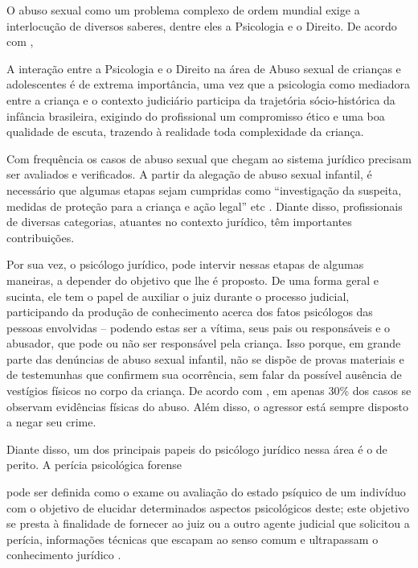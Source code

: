 O abuso sexual como um problema complexo de ordem mundial exige a interlocução de diversos saberes, dentre eles a Psicologia e o Direito. De acordo com , 

\begin{citacao}
	A interação entre a Psicologia e o Direito na área de Abuso sexual de crianças e adolescentes é de extrema importância, uma vez que a psicologia como mediadora entre a criança e o contexto judiciário participa da trajetória sócio-histórica da infância brasileira, exigindo do profissional um compromisso ético e uma boa qualidade de escuta, trazendo à realidade toda complexidade da criança.
\end{citacao}

Com frequência os casos de abuso sexual que chegam ao sistema jurídico precisam ser avaliados e verificados. A partir da alegação de abuso sexual infantil, é necessário que algumas etapas sejam cumpridas como ``investigação da suspeita, medidas de proteção para a criança e ação legal'' etc . Diante disso, profissionais de diversas categorias, atuantes no contexto jurídico, têm importantes contribuições. 

Por sua vez, o psicólogo jurídico, pode intervir nessas etapas de algumas maneiras, a depender do objetivo que lhe é proposto. De uma forma geral e sucinta, ele tem o papel de auxiliar o juiz durante o processo judicial, participando da produção de conhecimento acerca dos fatos psicólogos das pessoas envolvidas -- podendo estas ser a vítima, seus pais ou responsáveis e o abusador, que pode ou não ser responsável pela criança. Isso porque, em grande parte das denúncias de abuso sexual infantil, não se dispõe de provas materiais e de testemunhas que confirmem  sua ocorrência, sem falar da possível ausência de vestígios físicos no corpo da criança. De acordo com , em apenas 30\% dos casos se observam evidências físicas do abuso. Além disso, o agressor está sempre disposto a negar seu crime. 

Diante disso, um dos principais papeis do psicólogo jurídico nessa área é o de perito. A perícia psicológica forense

\begin{citacao}
	pode ser definida como o exame ou avaliação do estado psíquico de um indivíduo com o objetivo de elucidar determinados aspectos psicológicos deste; este objetivo se presta à finalidade de fornecer ao juiz ou a outro agente judicial que solicitou a perícia, informações técnicas que escapam ao senso comum e ultrapassam o conhecimento jurídico \cite[p. 36]{JUNG2006}.
\end{citacao}

